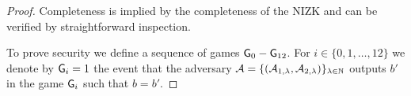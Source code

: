 \begin{proof}
Completeness is implied by the completeness of the NIZK and can be verified by straightforward inspection. 



%
%
%
%
%



To prove security we define a sequence of games $\mathsf{G}_0 - \mathsf{G}_{12}$.  For $i \in \{0,1,\dots,12\}$ we denote by $\mathsf{G}_i = 1$ the event that the adversary $\mathcal{A} = \{(\mathcal{A}_{1,\lambda}, \mathcal{A}_{2, \lambda})\}_{\lambda \in \mathbb{N}}$ outputs $b'$ in the game $\mathsf{G}_i$ such that $b = b'$.


\end{proof}
